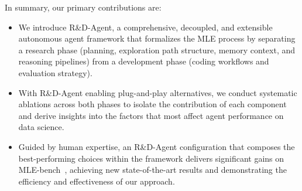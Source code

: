 In summary, our primary contributions are:
\begin{itemize}[leftmargin=4ex]
  \item We introduce R\&D-Agent, a comprehensive, decoupled, and extensible autonomous agent framework that formalizes the MLE process by separating a research phase (planning, exploration path structure, memory context, and reasoning pipelines) from a development phase (coding workflows and evaluation strategy). 
  \item With R\&D-Agent enabling plug-and-play alternatives, we conduct systematic ablations across both phases to isolate the contribution of each component and derive insights into the factors that most affect agent performance on data science.
  \item Guided by human expertise, an R\&D-Agent configuration that composes the best-performing choices within the framework delivers significant gains on MLE-bench~\citep{chan2024mle-bench}, achieving new state-of-the-art results and demonstrating the efficiency and effectiveness of our approach.
\end{itemize}

